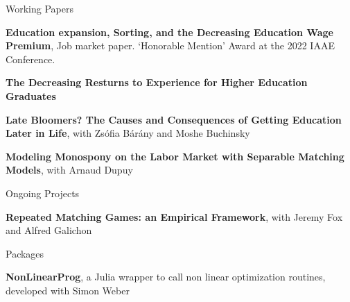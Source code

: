 \documentclass{resume} %
\begin{document}
\begin{rSection}{Working Papers}

  {\bf Education expansion, Sorting, and the Decreasing Education Wage Premium}, Job market paper. ‘Honorable Mention' Award at the 2022 IAAE Conference.
  
  {\bf The Decreasing Resturns to Experience for Higher Education Graduates}

  {\bf Late Bloomers? The Causes and Consequences of Getting Education Later in Life}, with Zsófia Bárány and Moshe Buchinsky

  {\bf Modeling Monospony on the Labor Market with Separable Matching Models}, with Arnaud Dupuy
  
  \end{rSection}

\begin{rSection}{Ongoing Projects}

{\bf Repeated Matching Games: an Empirical Framework}, with Jeremy Fox and Alfred Galichon

\end{rSection}

\begin{rSection}{Packages}

{\bf NonLinearProg}, a Julia wrapper to call non linear optimization routines, developed with Simon Weber
\end{rSection}

\end{document}
